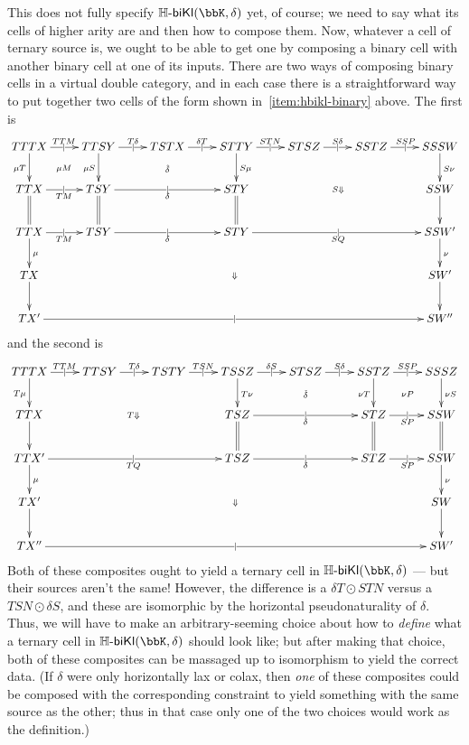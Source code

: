 \documentclass{amsart}
\newcommand{\K}{\bbK}
\newcommand{\Hbikl}[2]{\mathbb{H}\text{-}\mathsf{biKl}(#1,#2)}
\begin{document}
This does not fully specify $\Hbikl{\K}{\delta}$ yet, of course; we need to say what its cells of higher arity are and then how to compose them.
Now, whatever a cell of ternary source is, we ought to be able to get one by composing a binary cell with another binary cell at one of its inputs.
There are two ways of composing binary cells in a virtual double category, and in each case there is a straightforward way to put together two cells of the form shown in~\ref{item:hbikl-binary} above.
The first is
\[ \xymatrix{ TTTX \ar[r]|{|}^{TTM} \ar[d]_{\mu T} \ar@{}[dr]|{\mu M} &
  TTSY \ar[r]|{|}^{T\delta} \ar[d]_{\mu S} \ar@{}[drr]|{\hat\delta} & 
  TSTX \ar[r]|{|}^{\delta T} &
  STTY \ar[r]|{|}^{STN} \ar@{}[ddrrr]|{S\Downarrow} \ar[d]^{S\mu} &
  STSZ \ar[r]|{|}^{S\delta} & 
  SSTZ \ar[r]|{|}^{SSP} & 
  SSSW \ar[d]^{S\nu}\\
  TTX \ar@{=}[d] \ar[r]|{|}_{TM} & 
  TSY \ar[rr]|{|}_{\delta} \ar@{=}[d] && 
  STY \ar@{=}[d] &&& SSW \ar[d] \\
  TTX \ar[d]^{\mu} \ar@{}[ddrrrrrr]|{\Downarrow} \ar[r]|{|}_{TM} &
  TSY \ar[rr]|{|}_{\delta} && 
  STY \ar[rrr]|{|}_{SQ} &&& SSW' \ar[d]^{\nu} \\
  TX \ar[d] &&&&&& SW'\ar[d]\\
  TX' \ar[rrrrrr]|{|} &&&&&& S W''}\]
and the second is
\[ \xymatrix {
  TTTX \ar[d]_{T\mu} \ar[r]|{|}^{TTM} \ar@{}[ddrrr]|{T\Downarrow} &
  TTSY \ar[r]|{|}^{T\delta} &
  TSTY \ar[r]|{|}^{TSN} &
  TSSZ \ar[d]^{T\nu} \ar[r]|{|}^{\delta S} \ar@{}[drr]|{\check\delta} &
  STSZ \ar[r]|{|}^{S\delta} &
  SSTZ \ar[d]_{\nu T} \ar[r]|{|}^{SSP} \ar@{}[dr]|{\nu P} & SSSZ \ar[d]^{\nu S} \\
  TTX \ar[d] &&& TSZ \ar@{=}[d] \ar[rr]|{|}_{\delta}
  && STZ \ar@{=}[d] \ar[r]|{|}_{SP} & SSW \ar@{=}[d] \\
  TTX' \ar[d]^{\mu} \ar@{}[ddrrrrrr]|{\Downarrow} \ar[rrr]|{|}_{TQ} &&&
  TSZ \ar[rr]|{|}_{\delta} && 
  STZ \ar[r]|{|}_{SP} & SSW \ar[d]^{\nu} \\
  TX' \ar[d] &&&&&& SW\ar[d]\\
  TX'' \ar[rrrrrr]|{|} &&&&&& S W'}\]
Both of these composites ought to yield a ternary cell in $\Hbikl\K\delta$ --- but their sources aren't the same!
However, the difference is a $\delta T \odot STN$ versus a $TSN\odot\delta S$, and these are isomorphic by the horizontal pseudonaturality of $\delta$.
Thus, we will have to make an arbitrary-seeming choice about how to \emph{define} what a ternary cell in $\Hbikl\K\delta$ should look like; but after making that choice, both of these composites can be massaged up to isomorphism to yield the correct data.
(If $\delta$ were only horizontally lax or colax, then \emph{one} of these composites could be composed with the corresponding constraint to yield something with the same source as the other; thus in that case only one of the two choices would work as the definition.)
\end{document}
